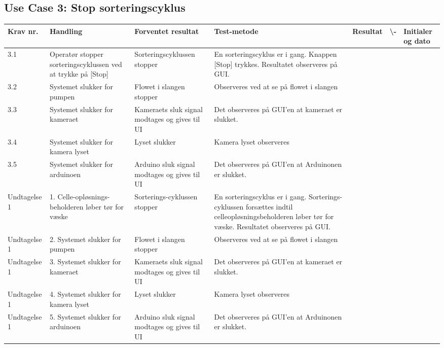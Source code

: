   \subsection{Use Case 3: Stop sorteringscyklus}
\begin{center}
		\begin{longtable}{ | m{1.785cm} | m{1.785cm}| m{1.785cm}| m{1.785cm}| m{1.785cm}| m{1.785cm}|m{1.785cm}| } 
			\hline
			\textbf{Krav nr.} &\textbf{ Handling} & \textbf{Forventet resultat} & \textbf{Test-metode} &\textbf{Resultat} & \textbf{ \checkmark \textbackslash -} & \textbf{Initialer og dato} \\ 
			
			\hline
			3.1 &  Operatør stopper sorteringscyklussen ved at trykke på [Stop] & Sorteringscyklussen stopper & En sorteringscyklus er i gang. Knappen [Stop] trykkes. Resultatet observeres på GUI.  &  & & \\
			\hline
			
			\hline
			3.2 &  Systemet slukker for pumpen & Flowet i slangen stopper & Observeres ved at se på flowet i slangen &  & & \\
			\hline
			
			3.3 &  Systemet slukker for kameraet  & Kameraets sluk signal modtages og gives til UI & Det observeres på GUI’en at kameraet er slukket.  &  & & \\
			\hline
			
			3.4 &  Systemet slukker for kamera lyset  & Lyset slukker & Kamera lyset observeres  &  & & \\
			\hline
			
			3.5 &  Systemet slukker for arduinoen & Arduino sluk signal modtages og gives til UI & Det observeres på GUI’en at Arduinonen er slukket. &  & & \\
			\hline
			
			Undtagelse 1 &  1. Celle-opløsnings-beholderen løber tør for væske & Sorterings-cyklussen stopper & En sorteringscyklus er i gang. Sorterings-cyklussen forsættes indtil celleopløsningsbeholderen løber tør for væske. Resultatet observeres på GUI. & & & \\
			\hline
			
	
			Undtagelse 1 &  2. Systemet slukker for pumpen & Flowet i slangen stopper & Observeres ved at se på flowet i slangen &  & & \\
			\hline
			
			Undtagelse 1 &  3. Systemet slukker for kameraet  & Kameraets sluk signal modtages og gives til UI & Det observeres på GUI’en at kameraet er slukket.  &  & & \\
			\hline
			
			Undtagelse 1 &  4. Systemet slukker for kamera lyset  & Lyset slukker & Kamera lyset observeres  &  & & \\
			\hline
			
			Undtagelse 1 &  5. Systemet slukker for arduinoen & Arduino sluk signal modtages og gives til UI & Det observeres på GUI’en at Arduinonen er slukket. &  & & \\
			\hline			
			
		\end{longtable}
		
	\end{center}
	\pagebreak